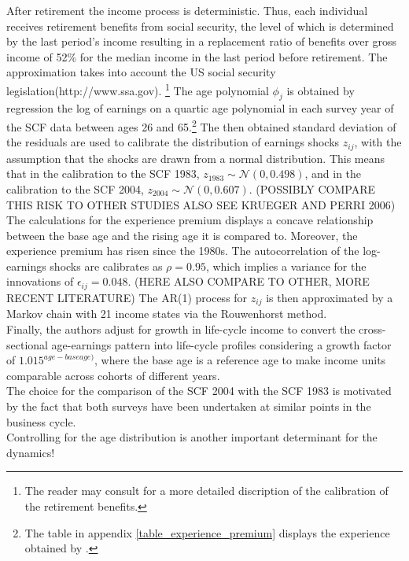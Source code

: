 \documentclass[a4paper,12pt]{article}
\begin{document}
After retirement the income process is deterministic. Thus, each individual receives retirement benefits from social security, the level of which is determined by the last period's income resulting in a replacement ratio of benefits over gross income of 52\% for the median income in the last period before retirement. The approximation takes into account the US social security legislation(http://www.ssa.gov). \footnote{The reader may consult \cite{hintermaier2011} for a more detailed discription of the calibration of the retirement benefits.} The age polynomial $\phi_{j}$ is obtained by  regression the log of earnings on a quartic age polynomial in each survey year of the SCF data between ages 26 and 65.\footnote{The table in appendix \ref{table_experience_premium} displays the experience obtained by \cite{hintermaier2011}.} The then obtained standard deviation of the residuals are used to calibrate the distribution of earnings shocks $z_{ij}$, with the assumption that the shocks are drawn from a normal distribution. This means that in the calibration to the SCF 1983, $z_{1983} \sim \mathcal{N}(0,0.498)$, and in the calibration to the SCF 2004, $z_{2004} \sim \mathcal{N}(0,0.607)$. (POSSIBLY COMPARE THIS RISK TO OTHER STUDIES ALSO SEE KRUEGER AND PERRI 2006) The calculations for the experience premium displays a concave relationship between the base age and the rising age it is compared to. Moreover, the experience premium has risen since the 1980s. The autocorrelation of the log-earnings shocks are calibrates as $\rho = 0.95$, which implies a variance for the innovations of $\epsilon_{ij} = 0.048$. (HERE ALSO COMPARE TO OTHER, MORE RECENT LITERATURE) The AR(1) process for $z_{ij}$ is then approximated by a Markov chain with 21 income states via the Rouwenhorst method.\\

Finally, the authors adjust for growth in life-cycle income to convert the cross-sectional age-earnings pattern into life-cycle profiles considering a growth factor of $1.015^{age-base age)}$, where the base age is a reference age to make income units comparable across cohorts of different years. \\

The choice for the comparison of the SCF 2004 with the SCF 1983 is motivated by the fact that both surveys have been undertaken at similar points in the business cycle. \\ 

Controlling for the age distribution is another important determinant for the dynamics! \\
\end{document}
